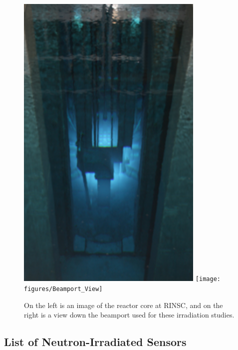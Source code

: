   \begin{figure}[!hbt]
  \begin{center}
    \includegraphics[width=0.80\textwidth]{figures/RINSC_Reactor_Core}
    \texttt{[image: figures/Beamport\_View]}
    \caption{On the left is an image of the reactor core at RINSC, and on the right is a view down the beamport used for these irradiation studies.}
    \label{fig:RINSC_Facility}
  \end{center}
\end{figure}


\subsection{List of Neutron-Irradiated Sensors}
\label{subsec:sensors_irradiation}
